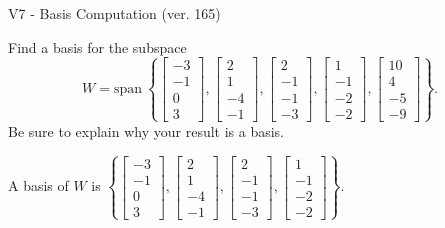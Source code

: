 \begin{exercise}
  \begin{exerciseTitle}V7 - Basis Computation (ver. 165)\end{exerciseTitle}
  \begin{exerciseStatement}
    Find a basis for the subspace 
\[W=\mathrm{span}\ \left\{\left[\begin{array}{r}
-3 \\
-1 \\
0 \\
3
\end{array}\right] , \left[\begin{array}{r}
2 \\
1 \\
-4 \\
-1
\end{array}\right] , \left[\begin{array}{r}
2 \\
-1 \\
-1 \\
-3
\end{array}\right] , \left[\begin{array}{r}
1 \\
-1 \\
-2 \\
-2
\end{array}\right] , \left[\begin{array}{r}
10 \\
4 \\
-5 \\
-9
\end{array}\right]\right\}.\]
 Be sure to explain why your result is a basis.


  \end{exerciseStatement}
  \begin{exerciseAnswer}
   A basis of \(W\) is  \(\left\{\left[\begin{array}{r}
-3 \\
-1 \\
0 \\
3
\end{array}\right] , \left[\begin{array}{r}
2 \\
1 \\
-4 \\
-1
\end{array}\right] , \left[\begin{array}{r}
2 \\
-1 \\
-1 \\
-3
\end{array}\right] , \left[\begin{array}{r}
1 \\
-1 \\
-2 \\
-2
\end{array}\right]\right\}\).
  


  \end{exerciseAnswer}
\end{exercise}